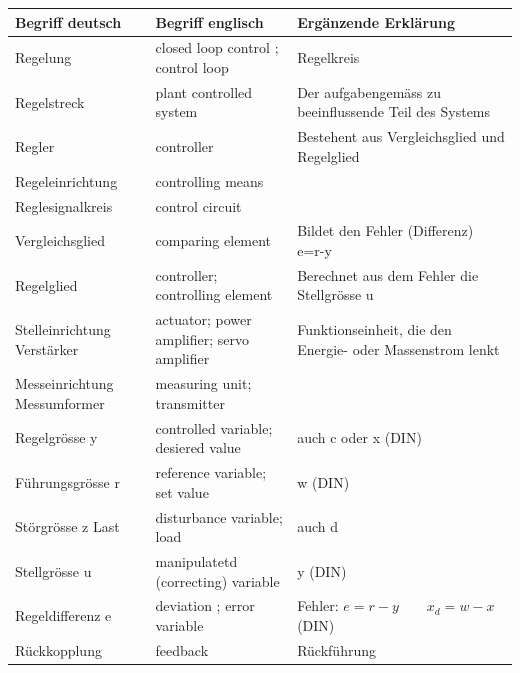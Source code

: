 	\begin{tabular}{|p{2.7cm}|p{5.4cm}|l|}
    	\hline
    	{\bf Begriff deutsch}		&{\bf Begriff englisch}	&{\bf Ergänzende
    	Erklärung} \formelbuch{20}\\
		\hline
		Regelung			& closed loop control ; control loop & Regelkreis\\
		\hline
		Regelstreck			& plant controlled system	&Der aufgabengemäss zu beeinflussende
    	Teil des Systems\\
    	\hline
    	Regler				& controller			&Bestehent aus Vergleichsglied und Regelglied\\
    	\hline
    	Regeleinrichtung	& controlling means&\\
    	\hline
    	Reglesignalkreis	& control circuit&\\
    	\hline
    	Vergleichsglied		& comparing element	&Bildet den Fehler (Differenz)
    											e=r-y\\
    	\hline
    	Regelglied			&controller;
    						controlling element	&Berechnet aus dem Fehler die Stellgrösse u\\
    	\hline
    	Stelleinrichtung
    	Verstärker			&actuator;
					    	power amplifier;
    						servo amplifier		&Funktionseinheit, die den Energie- oder Massenstrom
    											lenkt\\
    	\hline
    	Messeinrichtung
    	Messumformer		&measuring unit;
    						transmitter&\\
    	\hline
    	Regelgrösse y		&controlled variable;
    						desiered value& auch c oder x (DIN)\\
    	\hline
    	Führungsgrösse r	&reference variable;
    						set value& w (DIN)\\
    	\hline
    	Störgrösse z Last	&disturbance variable;
    						load& auch d\\
    	\hline
    	Stellgrösse u		&manipulatetd (correcting)
    						variable& y (DIN)\\
    	\hline
    	Regeldifferenz e	&deviation ; error variable		& Fehler: $e=r-y \quad \quad x_d=w-x$ (DIN) \\
    	\hline
    	Rückkopplung		&feedback			&Rückführung\\
    	\hline

	\end{tabular}\\

		
